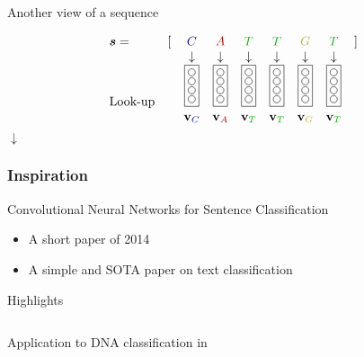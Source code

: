 \begin{frame}{Another view of a sequence}
    \begin{center}
      \begin{displaymath}
          \begin{array}{lcccccccc}
            \seq{s}=&[ &\cgc&\cga&\cgt&\cgt&\cgg&\cgt
                        &]\\
            &&\downarrow &\downarrow &\downarrow &\downarrow &\downarrow &\downarrow \\
            \textrm{Look-up}&&\wemb &\wemb &\wemb &\wemb &\wemb &\wemb  \\
               &&\wvector_{\cgc}&\wvector_{\cga}&\wvector_{\cgt}&\wvector_{\cgt}&\wvector_{\cgg}&\wvector_{\cgt} \\
          \end{array}
        \end{displaymath}
        {\huge $\downarrow$} \\
    \end{center}
\end{frame}



\begin{frame}
  \frametitle{Inspiration}
  \begin{block}{Convolutional Neural Networks for Sentence
      Classification}
    \begin{itemize}
    \item A short paper of 2014~\cite{Kim14Convolution}
    \item A simple and SOTA paper on text classification
    \end{itemize}
  \end{block}
  \begin{block}{Highlights}
    \begin{columns}
    \end{columns}
  \end{block}
  Application to DNA classification in~\cite{Xu17Enhancer,Cohn18Enhancer}
\end{frame}


